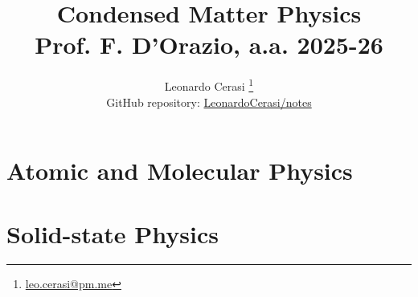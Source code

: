 \documentclass[a4paper, 12pt]{book}
\title{\Huge\textbf{Condensed Matter Physics} \\ \large Prof. F. D'Orazio, a.a. 2025-26}
\author{Leonardo Cerasi%
	\thanks{\scriptsize\href{mailto:leo.cerasi@pm.me}{leo.cerasi@pm.me}} \\
	\small GitHub repository: \href{https://github.com/LeonardoCerasi/notes}{LeonardoCerasi/notes}}
\date{}
\begin{document}
\frontmatter

\maketitle

\toc

\pagestyle{contents}

\mainmatter

\part{Atomic and Molecular Physics}
\pagestyle{body}












\part{Solid-state Physics}
\pagestyle{body}




\end{document}
